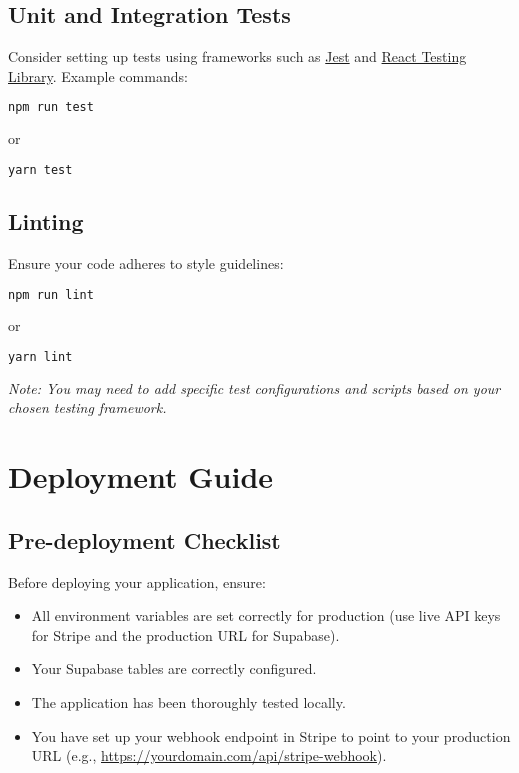 \documentclass[11pt]{article}
\begin{document}
\subsection{Unit and Integration Tests}
Consider setting up tests using frameworks such as \href{https://jestjs.io/}{Jest} and \href{https://testing-library.com/docs/react-testing-library/intro}{React Testing Library}. Example commands:
\begin{lstlisting}[language=bash]
npm run test
\end{lstlisting}
or
\begin{lstlisting}[language=bash]
yarn test
\end{lstlisting}

\subsection{Linting}
Ensure your code adheres to style guidelines:
\begin{lstlisting}[language=bash]
npm run lint
\end{lstlisting}
or
\begin{lstlisting}[language=bash]
yarn lint
\end{lstlisting}

\textit{Note: You may need to add specific test configurations and scripts based on your chosen testing framework.}

\section{Deployment Guide}

\subsection{Pre-deployment Checklist}
Before deploying your application, ensure:
\begin{itemize}[leftmargin=*]
    \item All environment variables are set correctly for production (use live API keys for Stripe and the production URL for Supabase).
    \item Your Supabase tables are correctly configured.
    \item The application has been thoroughly tested locally.
    \item You have set up your webhook endpoint in Stripe to point to your production URL (e.g., \url{https://yourdomain.com/api/stripe-webhook}).
\end{itemize}
\end{document}
